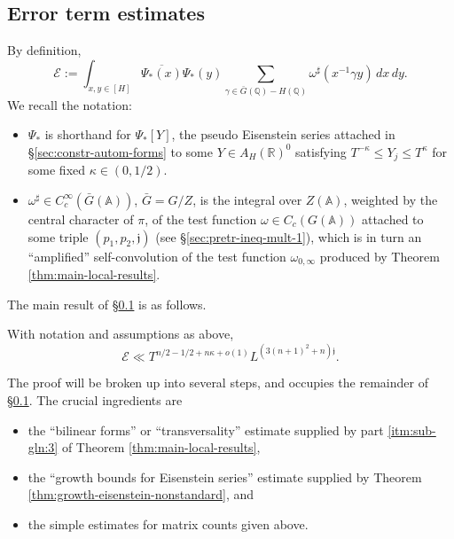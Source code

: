 \subsection{Error term estimates}\label{sec:error-term-estimates}
By definition,
\begin{equation}\label{eq:mathcale-:=E--int}
  \mathcal{E}
  := \int_{x, y \in [H]} \overline{\Psi_{\ast}(x)} \Psi_{\ast}(y)
  \sum_{\gamma \in \bar{G}(\mathbb{Q}) - H(\mathbb{Q})} \omega^\sharp(x^{-1} \gamma y) \, d x \, d y.
\end{equation}
We recall the notation:
\begin{itemize}
\item $\Psi_{\ast}$ is shorthand for $\Psi_{\ast}[Y]$, the pseudo Eisenstein series attached in \S\ref{sec:constr-autom-forms} to some $Y \in A_H(\mathbb{R})^0$ satisfying $T^{-\kappa} \leq Y_j \leq T^{\kappa}$ for some fixed $\kappa \in (0,1/2)$.
\item $\omega^\sharp \in C_c^\infty(\bar{G}(\mathbb{A}))$, $\bar{G} = G/Z$, is the integral over $Z(\mathbb{A})$, weighted by the central character of $\pi$, of the test function $\omega \in C_c(G(\mathbb{A}))$ attached to some triple $(p_1,p_2,\mathfrak{j})$ (see \S\ref{sec:pretr-ineq-mult-1}), which is in turn an ``amplified'' self-convolution of the test function $\omega_{0,\infty}$ produced by Theorem \ref{thm:main-local-results}.
\end{itemize}
The main result of \S\ref{sec:error-term-estimates} is as follows.
\begin{proposition}\label{prop:standard2:with-notat-assumpt}
  With notation and assumptions as above,
  \begin{equation*}
    \mathcal{E} \ll
    T^{n/2 - 1/2 + n \kappa + o(1)}
    L^{(3 (n+1)^2 + n) \mathfrak{j}}.
  \end{equation*}
\end{proposition}
The proof will be broken up into several steps, and occupies the remainder of \S\ref{sec:error-term-estimates}.  The crucial ingredients are
\begin{itemize}
\item the ``bilinear forms'' or ``transversality'' estimate supplied by part \eqref{itm:sub-gln:3} of Theorem \ref{thm:main-local-results},
\item the ``growth bounds for Eisenstein series'' estimate supplied by Theorem \ref{thm:growth-eisenstein-nonstandard}, and
\item the simple estimates for matrix counts given above.
\end{itemize}

